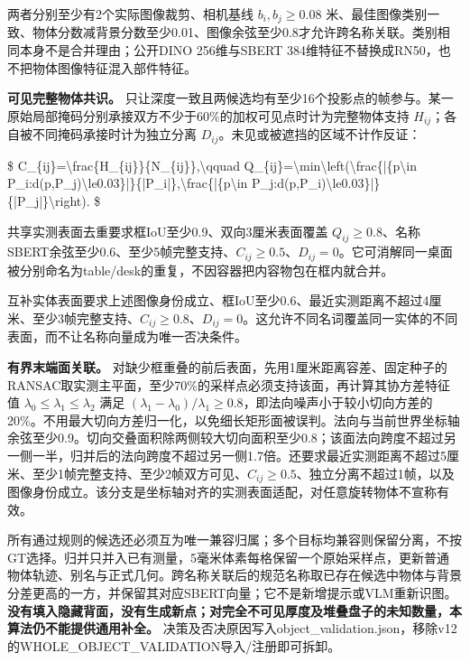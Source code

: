 \documentclass[UTF8,fontset=fandol]{ctexart}
\begin{document}
两者分别至少有2个实际图像裁剪、相机基线 $b_i,b_j\ge0.08$ 米、最佳图像类别一致、物体分数减背景分数至少0.01、图像余弦至少0.8才允许跨名称关联。类别相同本身不是合并理由；公开DINO 256维与SBERT 384维特征不替换成RN50，也不把物体图像特征混入部件特征。



\textbf{可见完整物体共识。} 只让深度一致且两候选均有至少16个投影点的帧参与。某一原始局部掩码分别承接双方不少于60\%的加权可见点时计为完整物体支持 $H_{ij}$；各自被不同掩码承接时计为独立分离 $D_{ij}$。未见或被遮挡的区域不计作反证：



\$
C\_\{ij\}=\textbackslash{}frac\{H\_\{ij\}\}\{N\_\{ij\}\},\textbackslash{}qquad
Q\_\{ij\}=\textbackslash{}min\textbackslash{}left(\textbackslash{}frac\{|\{p\textbackslash{}in P\_i:d(p,P\_j)\textbackslash{}le0.03\}|\}\{|P\_i|\},\textbackslash{}frac\{|\{p\textbackslash{}in P\_j:d(p,P\_i)\textbackslash{}le0.03\}|\}\{|P\_j|\}\textbackslash{}right).
\$



共享实测表面去重要求框IoU至少0.9、双向3厘米表面覆盖 $Q_{ij}\ge0.8$、名称SBERT余弦至少0.6、至少5帧完整支持、$C_{ij}\ge0.5$、$D_{ij}=0$。它可消解同一桌面被分别命名为table/desk的重复，不因容器把内容物包在框内就合并。



互补实体表面要求上述图像身份成立、框IoU至少0.6、最近实测距离不超过4厘米、至少3帧完整支持、$C_{ij}\ge0.8$、$D_{ij}=0$。这允许不同名词覆盖同一实体的不同表面，而不让名称向量成为唯一否决条件。



\textbf{有界末端面关联。} 对缺少框重叠的前后表面，先用1厘米距离容差、固定种子的RANSAC取实测主平面，至少70\%的采样点必须支持该面，再计算其协方差特征值 $\lambda_0\le\lambda_1\le\lambda_2$ 满足 $(\lambda_1-\lambda_0)/\lambda_1\ge0.8$，即法向噪声小于较小切向方差的20\%。不用最大切向方差归一化，以免细长矩形面被误判。法向与当前世界坐标轴余弦至少0.9。切向交叠面积除两侧较大切向面积至少0.8；该面法向跨度不超过另一侧一半，归并后的法向跨度不超过另一侧1.7倍。还要求最近实测距离不超过5厘米、至少1帧完整支持、至少2帧双方可见、$C_{ij}\ge0.5$、独立分离不超过1帧，以及图像身份成立。该分支是坐标轴对齐的实测表面适配，对任意旋转物体不宣称有效。



所有通过规则的候选还必须互为唯一兼容归属；多个目标均兼容则保留分离，不按GT选择。归并只并入已有测量，5毫米体素每格保留一个原始采样点，更新普通物体轨迹、别名与正式几何。跨名称关联后的规范名称取已存在候选中物体与背景分差更高的一方，并保留其对应SBERT向量；它不是新增提示或VLM重新识图。\textbf{没有填入隐藏背面，没有生成新点；对完全不可见厚度及堆叠盘子的未知数量，本算法仍不能提供通用补全。} 决策及否决原因写入object\_validation.json，移除v12的WHOLE\_OBJECT\_VALIDATION导入/注册即可拆卸。
\end{document}
